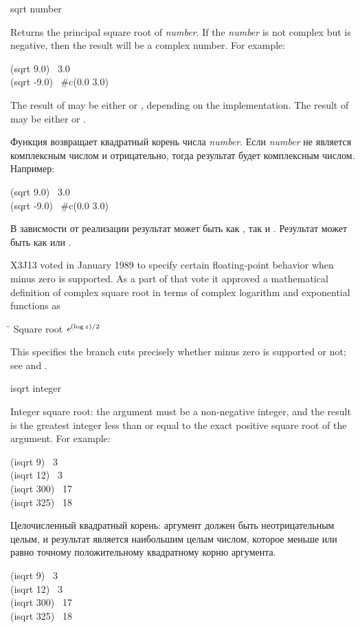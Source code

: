 \begin{defun}[Function]
sqrt number

Returns the principal square root of \emph{number}.
If the \emph{number} is not complex but is negative, then the result
will be a complex number.
For example:
\begin{lisp}
(sqrt 9.0) \EV\ 3.0 \\
(sqrt -9.0) \EV\ \#c(0.0 3.0)
\end{lisp}
The result of  may be either  or , depending on the
implementation.  The result of  may be either 
or .

Функция возвращает квадратный корень числа \emph{number}.
Если \emph{number} не является комплексным числом и отрицательно, тогда
результат будет комплексным числом.
Например:
\begin{lisp}
(sqrt 9.0) \EV\ 3.0 \\
(sqrt -9.0) \EV\ \#c(0.0 3.0)
\end{lisp}
В зависмости от реализации результат  может быть как , так и
. Результат  может быть как  или .

\begin{new}
X3J13 voted in January 1989
to specify certain floating-point behavior when minus zero is supported.
As a part of that vote it approved a mathematical definition of complex square root
in terms of complex logarithm and exponential functions as
\begin{tabbing}
\hskip 10pc\=\kill
Square root\> $ \emph{e}^{(\log z)/2} $
\end{tabbing}
This specifies the branch cuts precisely whether minus zero is supported or not;
see  and .
\end{new}
\end{defun}

\begin{defun}[Function]
isqrt integer

Integer square root: the argument must be a non-negative integer, and the
result is the greatest integer less than or equal to the exact positive
square root of the argument.
For example:
\begin{lisp}
(isqrt 9) \EV\ 3 \\
(isqrt 12) \EV\ 3 \\
(isqrt 300) \EV\ 17 \\
(isqrt 325) \EV\ 18
\end{lisp}

Целочисленный квадратный корень: аргумент должен быть неотрицательным целым, и
результат является наибольшим целым числом, которое меньше или равно точному
положительному квадратному корню аргумента.
\begin{lisp}
(isqrt 9) \EV\ 3 \\
(isqrt 12) \EV\ 3 \\
(isqrt 300) \EV\ 17 \\
(isqrt 325) \EV\ 18
\end{lisp}
\end{defun}

